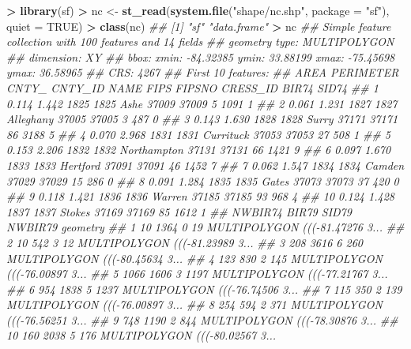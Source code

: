 \documentclass[]{book}
\newenvironment{Shaded}{\begin{snugshade}}{\end{snugshade}}
\newcommand{\CommentTok}[1]{\textcolor[rgb]{0.56,0.35,0.01}{\textit{#1}}}
\newcommand{\DataTypeTok}[1]{\textcolor[rgb]{0.13,0.29,0.53}{#1}}
\newcommand{\KeywordTok}[1]{\textcolor[rgb]{0.13,0.29,0.53}{\textbf{#1}}}
\newcommand{\NormalTok}[1]{#1}
\newcommand{\OperatorTok}[1]{\textcolor[rgb]{0.81,0.36,0.00}{\textbf{#1}}}
\newcommand{\OtherTok}[1]{\textcolor[rgb]{0.56,0.35,0.01}{#1}}
\newcommand{\StringTok}[1]{\textcolor[rgb]{0.31,0.60,0.02}{#1}}
\theoremstyle{definition}
\theoremstyle{definition}
\theoremstyle{definition}
\theoremstyle{remark}
\begin{document}
\begin{Shaded}
\begin{Highlighting}[]
\OperatorTok{>}\StringTok{ }\KeywordTok{library}\NormalTok{(sf)}
\OperatorTok{>}\StringTok{ }\NormalTok{nc <-}\StringTok{ }\KeywordTok{st_read}\NormalTok{(}\KeywordTok{system.file}\NormalTok{(}\StringTok{"shape/nc.shp"}\NormalTok{, }\DataTypeTok{package =} \StringTok{"sf"}\NormalTok{), }\DataTypeTok{quiet =} \OtherTok{TRUE}\NormalTok{)}
\OperatorTok{>}\StringTok{ }\KeywordTok{class}\NormalTok{(nc)}
\CommentTok{## [1] "sf"         "data.frame"}
\OperatorTok{>}\StringTok{ }\NormalTok{nc}
\CommentTok{## Simple feature collection with 100 features and 14 fields}
\CommentTok{## geometry type:  MULTIPOLYGON}
\CommentTok{## dimension:      XY}
\CommentTok{## bbox:           xmin: -84.32385 ymin: 33.88199 xmax: -75.45698 ymax: 36.58965}
\CommentTok{## CRS:            4267}
\CommentTok{## First 10 features:}
\CommentTok{##     AREA PERIMETER CNTY_ CNTY_ID        NAME  FIPS FIPSNO CRESS_ID BIR74 SID74}
\CommentTok{## 1  0.114     1.442  1825    1825        Ashe 37009  37009        5  1091     1}
\CommentTok{## 2  0.061     1.231  1827    1827   Alleghany 37005  37005        3   487     0}
\CommentTok{## 3  0.143     1.630  1828    1828       Surry 37171  37171       86  3188     5}
\CommentTok{## 4  0.070     2.968  1831    1831   Currituck 37053  37053       27   508     1}
\CommentTok{## 5  0.153     2.206  1832    1832 Northampton 37131  37131       66  1421     9}
\CommentTok{## 6  0.097     1.670  1833    1833    Hertford 37091  37091       46  1452     7}
\CommentTok{## 7  0.062     1.547  1834    1834      Camden 37029  37029       15   286     0}
\CommentTok{## 8  0.091     1.284  1835    1835       Gates 37073  37073       37   420     0}
\CommentTok{## 9  0.118     1.421  1836    1836      Warren 37185  37185       93   968     4}
\CommentTok{## 10 0.124     1.428  1837    1837      Stokes 37169  37169       85  1612     1}
\CommentTok{##    NWBIR74 BIR79 SID79 NWBIR79                       geometry}
\CommentTok{## 1       10  1364     0      19 MULTIPOLYGON (((-81.47276 3...}
\CommentTok{## 2       10   542     3      12 MULTIPOLYGON (((-81.23989 3...}
\CommentTok{## 3      208  3616     6     260 MULTIPOLYGON (((-80.45634 3...}
\CommentTok{## 4      123   830     2     145 MULTIPOLYGON (((-76.00897 3...}
\CommentTok{## 5     1066  1606     3    1197 MULTIPOLYGON (((-77.21767 3...}
\CommentTok{## 6      954  1838     5    1237 MULTIPOLYGON (((-76.74506 3...}
\CommentTok{## 7      115   350     2     139 MULTIPOLYGON (((-76.00897 3...}
\CommentTok{## 8      254   594     2     371 MULTIPOLYGON (((-76.56251 3...}
\CommentTok{## 9      748  1190     2     844 MULTIPOLYGON (((-78.30876 3...}
\CommentTok{## 10     160  2038     5     176 MULTIPOLYGON (((-80.02567 3...}
\end{Highlighting}
\end{Shaded}
\end{document}
